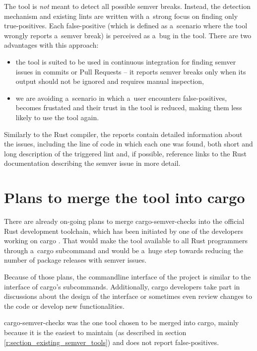 \documentclass[licencjacka,en]{pracamgr}
\begin{document}
The tool is \textit{not} meant to detect all possible semver breaks. Instead, the detection
mechanism and existing lints are written with a~strong focus on finding only true-positives.
Each false-positive (which is defined as a~scenario where the tool wrongly reports a~semver break)
is perceived as a~bug in the tool. There are two advantages with this approach:
\begin{itemize}
	\item the tool is suited to be used in continuous integration for finding semver issues in
		commits or Pull Requests -- it reports semver breaks only when its output should not be
		ignored and requires manual inspection,
	\item we are avoiding a~scenario in which a~user encounters false-positives, becomes
		frustated and their trust in the tool is reduced, making them less likely to use the
		tool again.
\end{itemize}

Similarly to the Rust compiler, the reports contain detailed information about the issues,
including the line of code in which each one was found, both short and long description of the
triggered lint and, if possible, reference links to the Rust documentation describing the semver
issue in more detail.

\section{Plans to merge the tool into cargo}\label{r:section_merge_into_cargo_plans}

There are already on-going plans to merge cargo-semver-checks into the official Rust development
toolchain, which has been initiated by one of the developers working on cargo
\cite{issue-merge-cargo}. That would make the tool available to all Rust programmers through
a~cargo subcommand and would be a~huge step towards reducing the number of package releases with
semver issues.

Because of those plans, the commandline interface of the project is similar to the interface of
cargo's subcommands. Additionally, cargo developers take part in discussions about the design of
the interface \cite{issue-cli-interface} or sometimes even review changes to the code or develop
new functionalities.

cargo-semver-checks was the one tool chosen to be merged into cargo, mainly because it is the
easiest to maintain (as described in section \ref{r:section_existing_semver_tools}) and does not
report false-positives.
\end{document}
